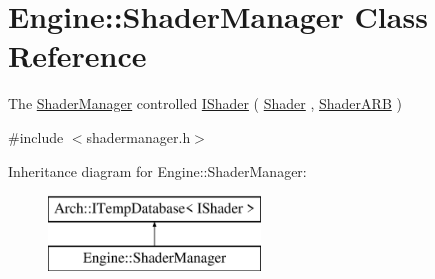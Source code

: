 \hypertarget{classEngine_1_1ShaderManager}{}\section{Engine\+:\+:Shader\+Manager Class Reference}
\label{classEngine_1_1ShaderManager}


The \hyperlink{classEngine_1_1ShaderManager}{Shader\+Manager} controlled \hyperlink{classEngine_1_1IShader}{I\+Shader} ( \hyperlink{classEngine_1_1Shader}{Shader} , \hyperlink{classEngine_1_1ShaderARB}{Shader\+A\+R\+B} )  




{\ttfamily \#include $<$shadermanager.\+h$>$}

Inheritance diagram for Engine\+:\+:Shader\+Manager\+:\begin{figure}[H]
\begin{center}
\leavevmode
\includegraphics[height=2.000000cm]{classEngine_1_1ShaderManager}
\end{center}
\end{figure}
